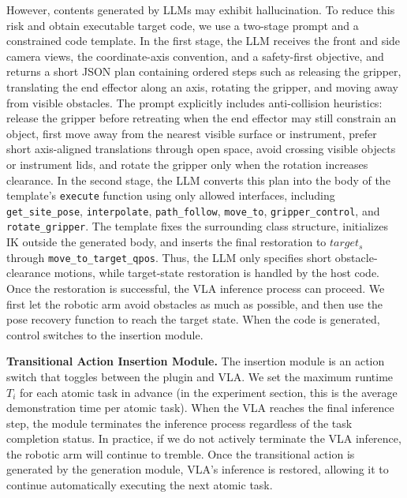 \documentclass[letterpaper]{article} %
\begin{document}
However, contents generated by LLMs may exhibit hallucination.
To reduce this risk and obtain executable target code, we use a two-stage prompt and a constrained code template. In the first stage, the LLM receives the front and side camera views, the coordinate-axis convention, and a safety-first objective, and returns a short JSON plan containing ordered steps such as releasing the gripper, translating the end effector along an axis, rotating the gripper, and moving away from visible obstacles. The prompt explicitly includes anti-collision heuristics: release the gripper before retreating when the end effector may still constrain an object, first move away from the nearest visible surface or instrument, prefer short axis-aligned translations through open space, avoid crossing visible objects or instrument lids, and rotate the gripper only when the rotation increases clearance. In the second stage, the LLM converts this plan into the body of the template's \texttt{execute} function using only allowed interfaces, including \texttt{get\_site\_pose}, \texttt{interpolate}, \texttt{path\_follow}, \texttt{move\_to}, \texttt{gripper\_control}, and \texttt{rotate\_gripper}. The template fixes the surrounding class structure, initializes IK outside the generated body, and inserts the final restoration to $target_s$ through \texttt{move\_to\_target\_qpos}. Thus, the LLM only specifies short obstacle-clearance motions, while target-state restoration is handled by the host code.
Once the restoration is successful, the VLA inference process can proceed. We first let the robotic arm avoid obstacles as much as possible, and then use the pose recovery function to reach the target state.
When the code is generated, control switches to the insertion module.

\textbf{Transitional Action Insertion Module.}
The insertion module is an action switch that toggles between the plugin and VLA.
We set the maximum runtime $T_i$ for each atomic task in advance
(in the experiment section, this is the average demonstration time per atomic task).
When the VLA reaches the final inference step, the module terminates the inference process regardless of the task completion status.
In practice, if we do not actively terminate the VLA inference, the robotic arm will continue to tremble.
Once the transitional action is generated by the generation module, VLA's inference is restored, allowing it to continue automatically executing the next atomic task.
\end{document}
